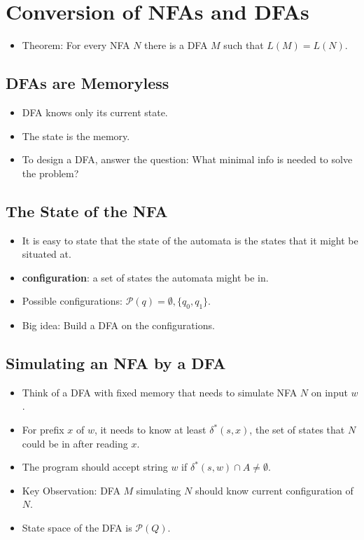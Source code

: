 \documentclass[12pt]{article}
\begin{document}
\section{Conversion of NFAs and DFAs}
\begin{itemize}
    \item Theorem: For every NFA $N$ there is a DFA $M$ such that $L(M) = L(N)$.
\end{itemize}

\subsection{DFAs are Memoryless}
\begin{itemize}
    \item DFA knows only its current state.
    \item The state is the memory.
    \item To design a DFA, answer the question: What minimal info is needed to solve the problem?
\end{itemize}

\subsection{The State of the NFA}
\begin{itemize}
    \item It is easy to state that the state of the automata is the states that it might be situated at.
    \item \textbf{configuration}: a set of states the automata might be in.
    \item Possible configurations: $\mathcal{P}(q) = \emptyset, \{ q_0, q_1 \}$.
    \item Big idea: Build a DFA on the configurations.
\end{itemize}

\subsection{Simulating an NFA by a DFA}
\begin{itemize}
    \item Think of a DFA with fixed memory that needs to simulate NFA $N$ on input $w$.
    \item For prefix $x$ of $w$, it needs to know at least $\delta^{\ast}(s, x)$, the set of states that $N$ could be in after reading $x$.
    \item The program should accept string $w$ if $\delta^{\ast}(s, w) \cap A \neq \emptyset$.
    \item Key Observation: DFA $M$ simulating $N$ should know current configuration of $N$.
    \item State space of the DFA is $\mathcal{P}(Q)$.
\end{itemize}
\end{document}
